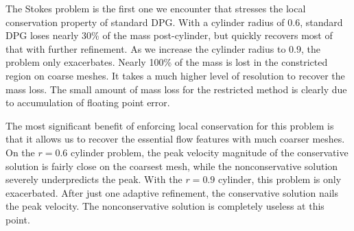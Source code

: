 \documentclass[Proposal.tex]{subfiles}
\begin{document}
The Stokes problem is the first one we encounter that stresses the local
conservation property of standard DPG. With a cylinder radius of $0.6$,
standard DPG loses nearly 30\% of the mass post-cylinder, but quickly recovers
most of that with further refinement. As we increase the cylinder radius to
$0.9$, the problem only exacerbates. Nearly 100\% of the mass is lost in the
constricted region on coarse meshes. It takes a much higher level of
resolution to recover the mass loss. 
The small amount of mass loss for the restricted method is clearly due to
accumulation of floating point error.

The most significant benefit of enforcing local conservation for this
problem is that it allows us to recover the essential flow features with much
coarser meshes. On the $r=0.6$ cylinder problem, the peak velocity magnitude
of the conservative solution is fairly close on the coarsest mesh, while the
nonconservative solution severely underpredicts the peak. With the $r=0.9$
cylinder, this problem is only exacerbated. After just one adaptive
refinement, the conservative solution nails the peak velocity. The
nonconservative solution is completely useless at this point.
\end{document}
